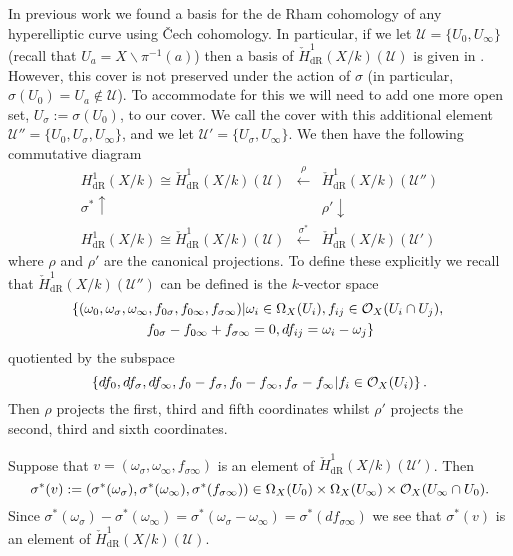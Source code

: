\documentclass[draft, 11pt]{article} %
\theoremstyle{plain}
\theoremstyle{remark}
\newcommand{\cO}{{\cal O}}
\newcommand{\cU}{{\mathcal U}}
\newcommand{\cech}{\v{C}ech }
\newcommand{\derhamhone}{H_{\text {dR}}^1(X/k)}
\newcommand{\cechderhamhone}{\check{H}_{\text {dR}}^1(X/k)}
\begin{document}
In previous work we found a basis for the de Rham cohomology of any hyperelliptic curve using \cech cohomology.
In particular,  if we let $\cU = \{ U_0 , U_\infty\}$ (recall that $U_a = X\backslash \pi^{-1}(a)$) then a basis of $\cechderhamhone(\cU)$ is given in \cite{derhamactions}.
However, this cover is not preserved under the action of $\sigma$ (in particular, $\sigma(U_0) = U_a \notin \cU$).
To accommodate for this we will need to add one more open set, $U_\sigma := \sigma(U_0)$, to our cover.
We call the cover with this additional element $\cU'' = \{U_0, U_\sigma, U_\infty \}$, and we let $\cU' = \{U_\sigma, U_\infty\}$.
We then have the following commutative diagram
\[
\begin{array}{ccc}
\derhamhone \cong \cechderhamhone(\cU)  & \xleftarrow{\rho} & \cechderhamhone(\cU'')  \\
\sigma^*\uparrow & ~ & \rho'\downarrow  \\
\derhamhone \cong \cechderhamhone(\cU)  & \xleftarrow{\sigma^*} & \cechderhamhone(\cU')
\end{array}
\]
where $\rho$ and $\rho'$ are the canonical projections.
To define these explicitly we recall that $\cechderhamhone(\cU'')$ can be defined is the $k$-vector space 
\begin{multline}\label{sixtupleconditions}
\left\{ (\omega_0, \omega_\sigma, \omega_\infty , f_{0\sigma}, f_{0 \infty},f_{\sigma \infty}) | \omega_i \in \Omega_X(U_i), f_{ij} \in \cO_X(U_i \cap U_j), \right. \\ \left. f_{0\sigma} - f_{0\infty} + f_{\sigma \infty} = 0, df_{ij} = \omega_i - \omega_j \right\}
\end{multline}
quotiented by the subspace 
\[
\left\{ df_0, df_\sigma, df_\infty, f_0- f_\sigma, f_0 - f_\infty, f_\sigma - f_\infty | f_i \in \cO_X(U_i)\right\}.
\]
Then $\rho$ projects the first, third and fifth coordinates whilst $\rho'$ projects the second, third and sixth coordinates.

Suppose that $v = (\omega_\sigma , \omega_\infty, f_{\sigma \infty})$ is an element of $\cechderhamhone(\cU')$.
Then
\begin{equation*}
\sigma^*(v) := (\sigma^*(\omega_\sigma), \sigma^*(\omega_\infty), \sigma^*(f_{\sigma \infty})) \in \Omega_X(U_0) \times \Omega_X(U_\infty) \times \cO_X(U_\infty \cap U_0).
\end{equation*}
Since $\sigma^*(\omega_\sigma)-\sigma^*(\omega_\infty) = \sigma^*(\omega_\sigma - \omega_\infty) = \sigma^*(df_{\sigma \infty})$ we see that $\sigma^*(v)$ is an element of $\cechderhamhone(\cU)$.
\end{document}
